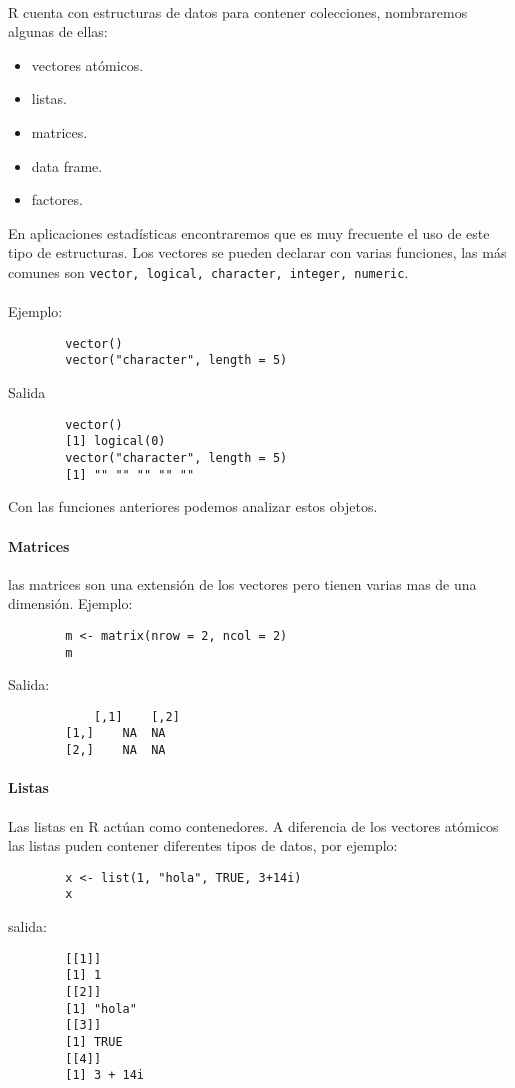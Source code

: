 \documentclass[12pt,hidelinks]{article}
\begin{document}
	\paragraph{} R cuenta con estructuras de datos para contener colecciones, nombraremos algunas de ellas:
	\begin{itemize}
		\item vectores atómicos.
		\item listas.
		\item matrices.
		\item data frame.
		\item factores.
	\end{itemize}
	En aplicaciones estadísticas encontraremos que es muy frecuente el uso de este tipo de estructuras.
	Los vectores se pueden declarar con varias funciones, las más comunes son \texttt{vector, logical, character, integer, numeric}.
	\paragraph{}Ejemplo:
	\begin{verbatim}
		vector()
		vector("character", length = 5)
	\end{verbatim}
	Salida
	\begin{verbatim}
		vector()
		[1] logical(0)
		vector("character", length = 5)
		[1] "" "" "" "" ""
	\end{verbatim}
	Con las funciones anteriores podemos analizar estos objetos.
	\paragraph{Matrices} las matrices son una extensión de los vectores pero tienen varias mas de una dimensión. Ejemplo:
	\begin{verbatim}
		m <- matrix(nrow = 2, ncol = 2)
		m
	\end{verbatim}
	Salida:
	\begin{verbatim}
			[,1]	[,2]
		[1,]	NA	NA
		[2,]	NA	NA
	\end{verbatim}
	\paragraph{Listas} Las listas en R actúan como contenedores. A diferencia de los vectores atómicos las listas puden contener diferentes tipos de datos, por ejemplo:
	\begin{verbatim}
		x <- list(1, "hola", TRUE, 3+14i)
		x	
	\end{verbatim}
	salida:
	\begin{verbatim}
		[[1]]
		[1] 1
		[[2]]
		[1] "hola"
		[[3]]
		[1] TRUE
		[[4]]
		[1] 3 + 14i
	\end{verbatim}
\end{document}
